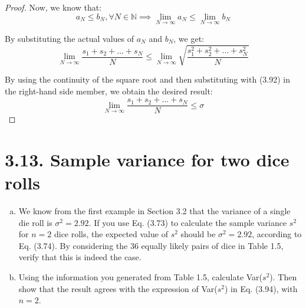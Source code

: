 \begin{proof}
    Now, we know that:
    \[
        a_N \leq b_N, \forall N \in \mathbb{N} \implies \lim_{N \to \infty} a_N \leq \lim_{N \to \infty} b_N
    \] 

    By substituting the actual values of $a_N$ and $b_N$, we get:
    \[
        \lim_{N \to \infty} \frac{s_1 + s_2 + \ldots + s_N}{N}
        \leq \lim_{N \to \infty} \sqrt{\frac{s_1^2 + s_2^2 + \ldots + s_N^2}{N}} 
    \] 

    By using the continuity of the square root and then substituting with (3.92) in the
    right-hand side member, we obtain the desired result:
    \begin{equation*}\tag{3.93}
        \lim_{N \to \infty} \frac{s_1 + s_2 + \ldots + s_N}{N} \leq \sigma
    \end{equation*}
\end{proof}

\section*{3.13. Sample variance for two dice rolls}
\begin{enumerate}[(a)]
    \item We know from the first example in Section 3.2 that the variance of a
        single die roll is $\sigma^2 = 2.92$. If you use Eq. (3.73) to
        calculate the sample variance  $s^2$ for $n = 2$ dice rolls,
        the expected value of $s^2$ should be $\sigma^2 = 2.92$,
        according to Eq. (3.74). By considering the 36 equally
        likely pairs of dice in Table 1.5, verify that this is indeed the case.

    \item Using the information you generated from Table 1.5, calculate Var($s^2$).
        Then show that the result agrees with the expression of Var($s^2$) in
        Eq. (3.94), with $n = 2$.
\end{enumerate}



\vspace{1em}

